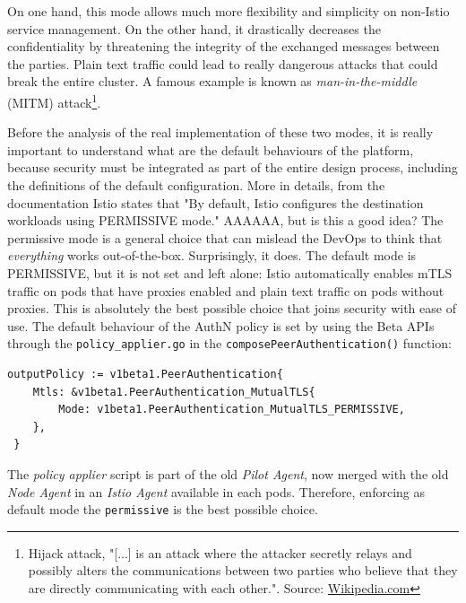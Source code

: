 On one hand, this mode allows much more flexibility and simplicity on non-Istio service management. On the other hand, it drastically decreases the confidentiality by threatening the integrity of the exchanged messages between the parties. Plain text traffic could lead to really dangerous attacks that could break the entire cluster. A famous example is known as \textit{man-in-the-middle} (MITM) attack\footnote{Hijack attack, "[...] is an attack where the attacker secretly relays and possibly alters the communications between two parties who believe that they are directly communicating with each other.". Source: \href{https://en.wikipedia.org/wiki/Man-in-the-middle_attack}{Wikipedia.com}}.

Before the analysis of the real implementation of these two modes, it is really important to understand what are the default behaviours of the platform, because security must be integrated as part of the entire design process, including the definitions of the default configuration. More in details, from the documentation Istio states that "By default, Istio configures the destination workloads using PERMISSIVE mode." AAAAAA, but is this a good idea? The permissive mode is a general choice that can mislead the DevOps to think that \textit{everything} works out-of-the-box. Surprisingly, it does. The default mode is PERMISSIVE, but it is not set and left alone: Istio automatically enables mTLS traffic on pods that have proxies enabled and plain text traffic on pods without proxies. This is absolutely the best possible choice that joins security with ease of use. The default behaviour of the AuthN policy is set by using the Beta APIs through the \texttt{policy\_applier.go} in the \texttt{composePeerAuthentication()} function:
\vspace{0.3cm}
\begin{lstlisting}[title={\href{https://github.com/istio/istio/blob/ec8b8ba452b372b8ceaf8a5dea973bc561bf39b4/pilot/pkg/security/authn/v1beta1/policy\_applier.go\#L411}{GitHub permalink}}]
 outputPolicy := v1beta1.PeerAuthentication{
    Mtls: &v1beta1.PeerAuthentication_MutualTLS{
        Mode: v1beta1.PeerAuthentication_MutualTLS_PERMISSIVE,
    },
 }

\end{lstlisting}


The \textit{policy applier} script is part of the old \textit{Pilot Agent}, now merged with the old \textit{Node Agent} in an \textit{Istio Agent} available in each pods. Therefore, enforcing as default mode the \texttt{permissive} is the best possible choice.

